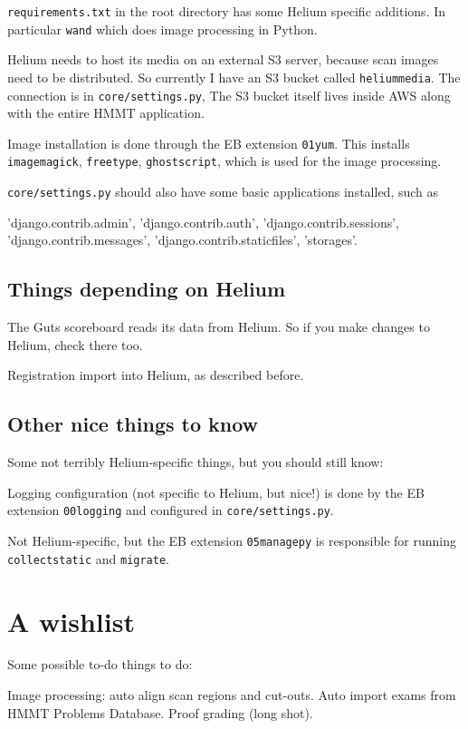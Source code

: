 \begin{itemize}
	\ii \texttt{requirements.txt} in the root directory
	has some Helium specific additions.
	In particular \texttt{wand} which does image processing in Python.

	\ii Helium needs to host its media on an external S3 server,
	because scan images need to be distributed.
	So currently I have an S3 bucket called \texttt{heliummedia}.
	The connection is in \texttt{core/settings.py},
	The S3 bucket itself lives inside AWS along with the entire HMMT application.

	\ii Image installation is done through the EB extension \texttt{01yum}.
	This installs \texttt{imagemagick}, \texttt{freetype}, \texttt{ghostscript},
	which is used for the image processing.
	
	\ii \texttt{core/settings.py} should also have some basic applications
	installed, such as
	\begin{itemize}
		\ii 'django.contrib.admin',
		\ii 'django.contrib.auth',
		\ii 'django.contrib.sessions',
		\ii 'django.contrib.messages',
		\ii 'django.contrib.staticfiles',
		\ii 'storages'.
	\end{itemize}
\end{itemize}

\subsection{Things depending on Helium}
\begin{itemize}
	\ii The Guts scoreboard reads its data from Helium.
	So if you make changes to Helium, check there too.
	
	\ii Registration import into Helium, as described before.
\end{itemize}

\subsection{Other nice things to know}
Some not terribly Helium-specific things, but you should still know:
\begin{itemize}
	\ii Logging configuration (not specific to Helium, but nice!)
	is done by the EB extension \texttt{00logging}
	and configured in \texttt{core/settings.py}.
	
	\ii Not Helium-specific, but the EB extension \texttt{05managepy}
	is responsible for running \texttt{collectstatic} and \texttt{migrate}.
\end{itemize}

\section{A wishlist}
Some possible to-do things to do:
\begin{itemize}
	\ii Image processing: auto align scan regions and cut-outs.
	\ii Auto import exams from HMMT Problems Database.
	\ii Proof grading (long shot).
\end{itemize}

